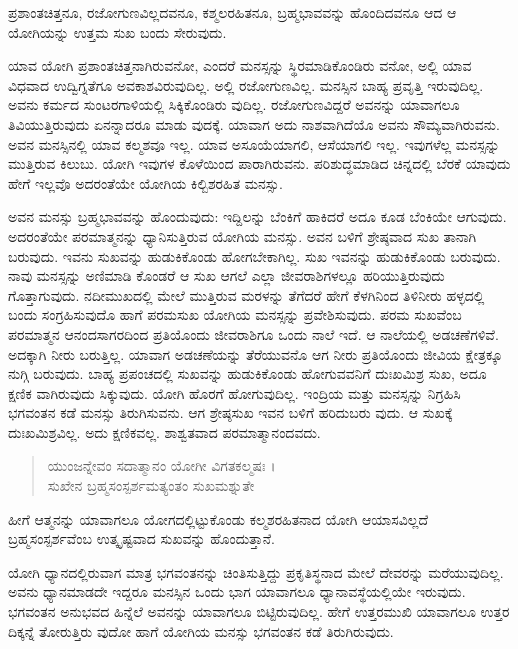 {\small ಪ್ರಶಾಂತಚಿತ್ತನೂ, ರಜೋಗುಣವಿಲ್ಲದವನೂ, ಕಶ್ಮಲರಹಿತನೂ, ಬ್ರಹ್ಮಭಾವವನ್ನು ಹೊಂದಿದವನೂ ಆದ ಆ ಯೋಗಿಯನ್ನು ಉತ್ತಮ ಸುಖ ಬಂದು ಸೇರುವುದು.}

ಯಾವ ಯೋಗಿ ಪ್ರಶಾಂತಚಿತ್ತನಾಗಿರುವನೋ, ಎಂದರೆ ಮನಸ್ಸನ್ನು ಸ್ಥಿರಮಾಡಿಕೊಂಡಿರು ವನೋ, ಅಲ್ಲಿ ಯಾವ ವಿಧವಾದ ಉದ್ವಿಗ್ನತೆಗೂ ಅವಕಾಶವಿರುವುದಿಲ್ಲ. ಅಲ್ಲಿ ರಜೋಗುಣವಿಲ್ಲ. ಮನಸ್ಸಿನ ಬಾಹ್ಯ ಪ್ರವೃತ್ತಿ ಇರುವುದಿಲ್ಲ. ಅವನು ಕರ್ಮದ ಸುಂಟರಗಾಳಿಯಲ್ಲಿ ಸಿಕ್ಕಿಕೊಂಡಿರು ವುದಿಲ್ಲ. ರಜೋಗುಣವಿದ್ದರೆ ಅವನನ್ನು ಯಾವಾಗಲೂ ತಿವಿಯುತ್ತಿರುವುದು ಏನನ್ನಾದರೂ ಮಾಡು ವುದಕ್ಕೆ. ಯಾವಾಗ ಅದು ನಾಶವಾಗಿದೆಯೊ ಅವನು ಸೌಮ್ಯವಾಗಿರುವನು. ಅವನ ಮನಸ್ಸಿನಲ್ಲಿ ಯಾವ ಕಲ್ಮಶವೂ ಇಲ್ಲ. ಯಾವ ಅಸೂಯೆಯಾಗಲಿ, ಆಸೆಯಾಗಲಿ ಇಲ್ಲ. ಇವುಗಳೆಲ್ಲ ಮನಸ್ಸನ್ನು ಮುತ್ತಿರುವ ಕಿಲುಬು. ಯೋಗಿ ಇವುಗಳ ಕೊಳೆಯಿಂದ ಪಾರಾಗಿರುವನು. ಪರಿಶುದ್ಧಮಾಡಿದ ಚಿನ್ನದಲ್ಲಿ ಬೆರಕೆ ಯಾವುದು ಹೇಗೆ ಇಲ್ಲವೊ ಅದರಂತೆಯೇ ಯೋಗಿಯ ಕಿಲ್ಬಿಶರಹಿತ ಮನಸ್ಸು.

ಅವನ ಮನಸ್ಸು ಬ್ರಹ್ಮಭಾವವನ್ನು ಹೊಂದುವುದು: ಇದ್ದಿಲನ್ನು ಬೆಂಕಿಗೆ ಹಾಕಿದರೆ ಅದೂ ಕೂಡ ಬೆಂಕಿಯೇ ಆಗುವುದು. ಅದರಂತೆಯೇ ಪರಮಾತ್ಮನನ್ನು ಧ್ಯಾನಿಸುತ್ತಿರುವ ಯೋಗಿಯ ಮನಸ್ಸು. ಅವನ ಬಳಿಗೆ ಶ್ರೇಷ್ಠವಾದ ಸುಖ ತಾನಾಗಿ ಬರುವುದು. ಇವನು ಸುಖವನ್ನು ಹುಡುಕಿಕೊಂಡು ಹೋಗಬೇಕಾಗಿಲ್ಲ. ಸುಖ ಇವನನ್ನು ಹುಡುಕಿಕೊಂಡು ಬರುವುದು. ನಾವು ಮನಸ್ಸನ್ನು ಅಣಿಮಾಡಿ ಕೊಂಡರೆ ಆ ಸುಖ ಆಗಲೆ ಎಲ್ಲಾ ಜೀವರಾಶಿಗಳಲ್ಲೂ ಹರಿಯುತ್ತಿರುವುದು ಗೊತ್ತಾಗುವುದು. ನದೀಮುಖದಲ್ಲಿ ಮೇಲೆ ಮುತ್ತಿರುವ ಮರಳನ್ನು ತೆಗೆದರೆ ಹೇಗೆ ಕೆಳಗಿನಿಂದ ತಿಳಿನೀರು ಹಳ್ಳದಲ್ಲಿ ಬಂದು ಸಂಗ್ರಹಿಸುವುದೊ ಹಾಗೆ ಪರಮಸುಖ ಯೋಗಿಯ ಮನಸ್ಸನ್ನು ಪ್ರವೇಶಿಸುವುದು. ಪರಮ ಸುಖವೆಂಬ ಪರಮಾತ್ಮನ ಆನಂದಸಾಗರದಿಂದ ಪ್ರತಿಯೊಂದು ಜೀವರಾಶಿಗೂ ಒಂದು ನಾಲೆ ಇದೆ. ಆ ನಾಲೆಯಲ್ಲಿ ಅಡಚಣೆಗಳಿವೆ. ಅದಕ್ಕಾಗಿ ನೀರು ಬರುತ್ತಿಲ್ಲ. ಯಾವಾಗ ಅಡಚಣೆಯನ್ನು ತೆರೆಯುವನೊ ಆಗ ನೀರು ಪ್ರತಿಯೊಂದು ಜೀವಿಯ ಕ್ಷೇತ್ರಕ್ಕೂ ನುಗ್ಗಿ ಬರುವುದು. ಬಾಹ್ಯ ಪ್ರಪಂಚದಲ್ಲಿ ಸುಖವನ್ನು ಹುಡುಕಿಕೊಂಡು ಹೋಗುವವನಿಗೆ ದುಃಖಮಿಶ್ರ ಸುಖ, ಅದೂ ಕ್ಷಣಿಕ ವಾಗಿರುವುದು ಸಿಕ್ಕುವುದು. ಯೋಗಿ ಹೊರಗೆ ಹೋಗುವುದಿಲ್ಲ. ಇಂದ್ರಿಯ ಮತ್ತು ಮನಸ್ಸನ್ನು ನಿಗ್ರಹಿಸಿ ಭಗವಂತನ ಕಡೆ ಮನಸ್ಸು ತಿರುಗಿಸುವನು. ಆಗ ಶ್ರೇಷ್ಠಸುಖ ಇವನ ಬಳಿಗೆ ಹರಿದುಬರು ವುದು. ಆ ಸುಖಕ್ಕೆ ದುಃಖಮಿಶ್ರವಿಲ್ಲ. ಅದು ಕ್ಷಣಿಕವಲ್ಲ. ಶಾಶ್ವತವಾದ ಪರಮಾತ್ಮಾನಂದವದು.

\begin{verse}
ಯುಂಜನ್ನೇವಂ ಸದಾತ್ಮಾನಂ ಯೋಗೀ ವಿಗತಕಲ್ಮಷಃ ।\\ಸುಖೇನ ಬ್ರಹ್ಮಸಂಸ್ಪರ್ಶಮತ್ಯಂತಂ ಸುಖಮಶ್ನುತೇ 
\end{verse}

{\small ಹೀಗೆ ಆತ್ಮನನ್ನು ಯಾವಾಗಲೂ ಯೋಗದಲ್ಲಿಟ್ಟುಕೊಂಡು ಕಲ್ಮಶರಹಿತನಾದ ಯೋಗಿ ಆಯಾಸವಿಲ್ಲದೆ ಬ್ರಹ್ಮಸಂಸ್ಪರ್ಶವೆಂಬ ಉತ್ಕೃಷ್ಟವಾದ ಸುಖವನ್ನು ಹೊಂದುತ್ತಾನೆ.}

ಯೋಗಿ ಧ್ಯಾನದಲ್ಲಿರುವಾಗ ಮಾತ್ರ ಭಗವಂತನನ್ನು ಚಿಂತಿಸುತ್ತಿದ್ದು ಪ್ರಕೃತಿಸ್ಥನಾದ ಮೇಲೆ ದೇವರನ್ನು ಮರೆಯುವುದಿಲ್ಲ. ಅವನು ಧ್ಯಾನಮಾಡದೇ ಇದ್ದರೂ ಮನಸ್ಸಿನ ಒಂದು ಭಾಗ ಯಾವಾಗಲೂ ಧ್ಯಾನಾವಸ್ಥೆಯಲ್ಲಿಯೇ ಇರುವುದು. ಭಗವಂತನ ಅನುಭವದ ಹಿನ್ನೆಲೆ ಅವನನ್ನು ಯಾವಾಗಲೂ ಬಿಟ್ಟಿರುವುದಿಲ್ಲ. ಹೇಗೆ ಉತ್ತರಮುಖಿ ಯಾವಾಗಲೂ ಉತ್ತರ ದಿಕ್ಕನ್ನೆ ತೋರುತ್ತಿರು ವುದೋ ಹಾಗೆ ಯೋಗಿಯ ಮನಸ್ಸು ಭಗವಂತನ ಕಡೆ ತಿರುಗಿರುವುದು.

